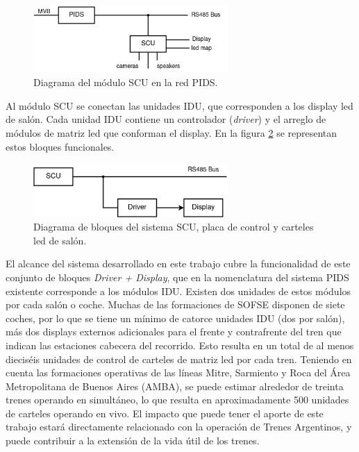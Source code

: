 \begin{figure}[ht]
	\centering
	\includegraphics[width=0.66\textwidth]{./Figures/diagPidsScuDevices.png}
	\caption{Diagrama del módulo SCU en la red PIDS.}
	\label{fig:diagPidsScuDevices}
\end{figure}

Al módulo SCU se conectan las unidades IDU, que corresponden a los display led de salón. Cada unidad IDU contiene un controlador (\textit{driver}) y el arreglo de módulos de matriz led que conforman el display. En la figura \ref{fig:diagScuDriverDisplay} se representan estos bloques funcionales.\\


\begin{figure}[ht]
	\centering
	\includegraphics[width=0.66\textwidth]{./Figures/diagScuDriverDisplay.png}
	\caption{Diagrama de bloques del sistema SCU, placa de control y carteles led de salón.}
	\label{fig:diagScuDriverDisplay}
\end{figure}

El alcance del sistema desarrollado en este trabajo cubre la funcionalidad de este conjunto de bloques \textit{Driver + Display}, que en la nomenclatura del sistema PIDS existente corresponde a los módulos IDU. Existen dos unidades de estos módulos por cada salón o coche. Muchas de las formaciones de SOFSE disponen de siete coches, por lo que se tiene un mínimo de catorce unidades IDU (dos por salón), más dos displays externos adicionales para el frente y contrafrente del tren que indican las estaciones cabecera del recorrido. Esto resulta en un total de al menos dieciséis unidades de control de carteles de matriz led por cada tren. Teniendo en cuenta las formaciones operativas de las líneas Mitre, Sarmiento y Roca del Área Metropolitana de Buenos Aires (AMBA), se puede estimar alrededor de treinta trenes operando en simultáneo, lo que resulta en aproximadamente 500 unidades de carteles operando en vivo. El impacto que puede tener el aporte de este trabajo estará directamente relacionado con la operación de Trenes Argentinos, y puede contribuir a la extensión de la vida útil de los trenes.\\

